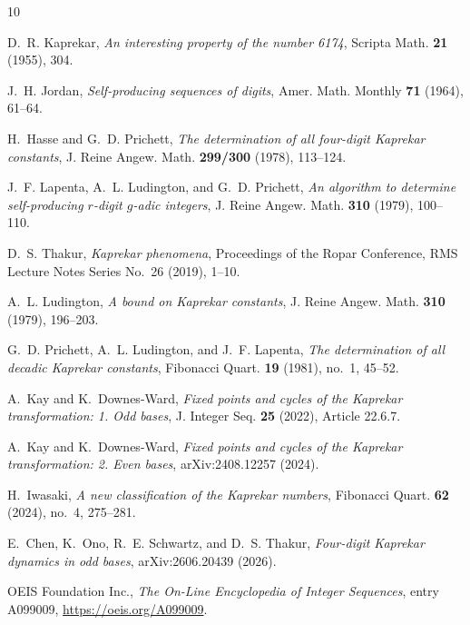 \documentclass[11pt]{amsart}
\theoremstyle{definition}
\begin{document}
\begin{thebibliography}{10}

D.~R. Kaprekar, \emph{An interesting property of the number 6174},
Scripta Math. \textbf{21} (1955), 304.

J.~H. Jordan, \emph{Self-producing sequences of digits}, Amer. Math.
Monthly \textbf{71} (1964), 61--64.

H.~Hasse and G.~D. Prichett, \emph{The determination of all four-digit
Kaprekar constants}, J. Reine Angew. Math. \textbf{299/300} (1978),
113--124.

J.~F. Lapenta, A.~L. Ludington, and G.~D. Prichett, \emph{An algorithm
to determine self-producing $r$-digit $g$-adic integers}, J. Reine
Angew. Math. \textbf{310} (1979), 100--110.

D.~S. Thakur, \emph{Kaprekar phenomena}, Proceedings of the Ropar
Conference, RMS Lecture Notes Series No.~26 (2019), 1--10.

A.~L. Ludington, \emph{A bound on Kaprekar constants}, J. Reine Angew.
Math. \textbf{310} (1979), 196--203.

G.~D. Prichett, A.~L. Ludington, and J.~F. Lapenta, \emph{The
determination of all decadic Kaprekar constants}, Fibonacci Quart.
\textbf{19} (1981), no.~1, 45--52.

A.~Kay and K.~Downes-Ward, \emph{Fixed points and cycles of the Kaprekar
transformation: 1. Odd bases}, J. Integer Seq. \textbf{25} (2022),
Article 22.6.7.

A.~Kay and K.~Downes-Ward, \emph{Fixed points and cycles of the Kaprekar
transformation: 2. Even bases}, arXiv:2408.12257 (2024).

H.~Iwasaki, \emph{A new classification of the Kaprekar numbers},
Fibonacci Quart. \textbf{62} (2024), no.~4, 275--281.

E.~Chen, K.~Ono, R.~E. Schwartz, and D.~S. Thakur, \emph{Four-digit
Kaprekar dynamics in odd bases}, arXiv:2606.20439 (2026).

OEIS Foundation Inc., \emph{The On-Line Encyclopedia of Integer
Sequences}, entry A099009, \url{https://oeis.org/A099009}.

\end{thebibliography}
\end{document}
